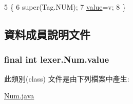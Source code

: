 \begin{DoxyCode}
5                       \{
6         super(Tag.NUM);
7         \hyperlink{classlexer_1_1_num_a38cc342dd32da91084432bb0c338b8b0}{value}=v;
8     \}
\end{DoxyCode}


\subsection{資料成員說明文件}
\subsubsection[{\texorpdfstring{value}{value}}]{\setlength{\rightskip}{0pt plus 5cm}final int lexer.\+Num.\+value}\hypertarget{classlexer_1_1_num_a38cc342dd32da91084432bb0c338b8b0}{}\label{classlexer_1_1_num_a38cc342dd32da91084432bb0c338b8b0}


此類別(class) 文件是由下列檔案中產生\+:\begin{DoxyCompactItemize}
\item 
\hyperlink{_num_8java}{Num.\+java}\end{DoxyCompactItemize}
